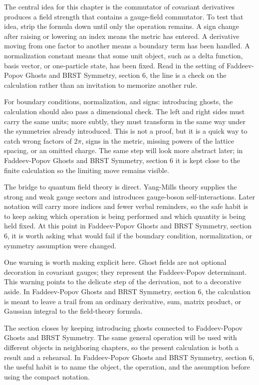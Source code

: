 The central idea for this chapter is the commutator of covariant derivatives produces a field strength that contains a gauge-field commutator.  To test that idea, strip the formula down until only the operation remains.  A sign change after raising or lowering an index means the metric has entered.  A derivative moving from one factor to another means a boundary term has been handled.  A normalization constant means that some unit object, such as a delta function, basis vector, or one-particle state, has been fixed.  Read in the setting of Faddeev-Popov Ghosts and BRST Symmetry, section 6, the line is a check on the calculation rather than an invitation to memorize another rule.

For boundary conditions, normalization, and signs: introducing ghosts, the calculation should also pass a dimensional check.  The left and right sides must carry the same units; more subtly, they must transform in the same way under the symmetries already introduced.  This is not a proof, but it is a quick way to catch wrong factors of \(2\pi\), signs in the metric, missing powers of the lattice spacing, or an omitted charge.  The same step will look more abstract later; in Faddeev-Popov Ghosts and BRST Symmetry, section 6 it is kept close to the finite calculation so the limiting move remains visible.

The bridge to quantum field theory is direct.  Yang-Mills theory supplies the strong and weak gauge sectors and introduces gauge-boson self-interactions.  Later notation will carry more indices and fewer verbal reminders, so the safe habit is to keep asking which operation is being performed and which quantity is being held fixed.  At this point in Faddeev-Popov Ghosts and BRST Symmetry, section 6, it is worth asking what would fail if the boundary condition, normalization, or symmetry assumption were changed.

One warning is worth making explicit here.  Ghost fields are not optional decoration in covariant gauges; they represent the Faddeev-Popov determinant.  This warning points to the delicate step of the derivation, not to a decorative aside.  In Faddeev-Popov Ghosts and BRST Symmetry, section 6, the calculation is meant to leave a trail from an ordinary derivative, sum, matrix product, or Gaussian integral to the field-theory formula.

The section closes by keeping introducing ghosts connected to Faddeev-Popov Ghosts and BRST Symmetry.  The same general operation will be used with different objects in neighboring chapters, so the present calculation is both a result and a rehearsal.  In Faddeev-Popov Ghosts and BRST Symmetry, section 6, the useful habit is to name the object, the operation, and the assumption before using the compact notation.



